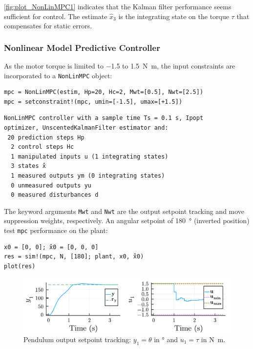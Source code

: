 \cref{fig:plot_NonLinMPC1} indicates that the Kalman filter performance seems sufficient for control. The estimate $\hat{x}_3$ is the integrating state on the torque $\tau$ that compensates for static errors. 

\subsubsection{Nonlinear Model Predictive Controller}

As the motor torque is limited to \num{-1.5} to \SI{1.5}{\newton\meter}, the input constraints are incorporated to a \texttt{NonLinMPC} object:
\begin{verbatim}
mpc = NonLinMPC(estim, Hp=20, Hc=2, Mwt=[0.5], Nwt=[2.5])
mpc = setconstraint!(mpc, umin=[-1.5], umax=[+1.5])
\end{verbatim}
\spacerepl
\begin{verbatim}
NonLinMPC controller with a sample time Ts = 0.1 s, Ipopt
optimizer, UnscentedKalmanFilter estimator and:
 20 prediction steps Hp
  2 control steps Hc
  1 manipulated inputs u (1 integrating states)
  3 states x̂
  1 measured outputs ym (0 integrating states)
  0 unmeasured outputs yu
  0 measured disturbances d
\end{verbatim}

The keyword arguments \texttt{Mwt} and \texttt{Nwt} are the output setpoint tracking and move suppression weights, respectively. An angular setpoint of \SI{180}{\degree} (inverted position) test \texttt{mpc} performance on the plant: 

\begin{verbatim}
x0 = [0, 0]; x̂0 = [0, 0, 0]
res = sim!(mpc, N, [180]; plant, x0, x̂0)
plot(res)
\end{verbatim}

\begin{figure}[h]
    \centering
    \includegraphics[width=\columnwidth]{fig/plot_NonLinMPC2.pdf}
    \caption{Pendulum output setpoint tracking: $y_1 = \theta$ in \si{\degree} and $u_1 = \tau$ in \si{\newton\meter}.}
    \label{fig:plot_NonLinMPC2}
\end{figure}

